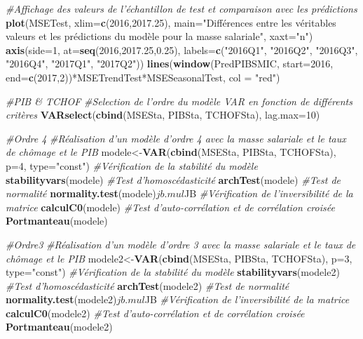 \documentclass[11pt,]{article}
\newenvironment{Shaded}{\begin{snugshade}}{\end{snugshade}}
\newcommand{\KeywordTok}[1]{\textcolor[rgb]{0.13,0.29,0.53}{\textbf{{#1}}}}
\newcommand{\DataTypeTok}[1]{\textcolor[rgb]{0.13,0.29,0.53}{{#1}}}
\newcommand{\DecValTok}[1]{\textcolor[rgb]{0.00,0.00,0.81}{{#1}}}
\newcommand{\FloatTok}[1]{\textcolor[rgb]{0.00,0.00,0.81}{{#1}}}
\newcommand{\StringTok}[1]{\textcolor[rgb]{0.31,0.60,0.02}{{#1}}}
\newcommand{\CommentTok}[1]{\textcolor[rgb]{0.56,0.35,0.01}{\textit{{#1}}}}
\newcommand{\NormalTok}[1]{{#1}}
\begin{document}
\begin{Shaded}
\begin{Highlighting}[]
\CommentTok{#Affichage des valeurs de l'échantillon de test et comparaison avec les prédictions}
\KeywordTok{plot}\NormalTok{(MSETest, }\DataTypeTok{xlim=}\KeywordTok{c}\NormalTok{(}\DecValTok{2016}\NormalTok{,}\FloatTok{2017.25}\NormalTok{), }\DataTypeTok{main=}\StringTok{"Différences entre les véritables}
\StringTok{     valeurs et les prédictions du modèle pour la masse salariale"}\NormalTok{, }\DataTypeTok{xaxt=}\StringTok{"n"}\NormalTok{)}
\KeywordTok{axis}\NormalTok{(}\DataTypeTok{side=}\DecValTok{1}\NormalTok{, }\DataTypeTok{at=}\KeywordTok{seq}\NormalTok{(}\DecValTok{2016}\NormalTok{,}\FloatTok{2017.25}\NormalTok{,}\FloatTok{0.25}\NormalTok{), }\DataTypeTok{labels=}\KeywordTok{c}\NormalTok{(}\StringTok{"2016Q1"}\NormalTok{, }\StringTok{"2016Q2"}\NormalTok{, }\StringTok{"2016Q3"}\NormalTok{, }\StringTok{"2016Q4"}\NormalTok{, }\StringTok{"2017Q1"}\NormalTok{, }\StringTok{"2017Q2"}\NormalTok{))}
\KeywordTok{lines}\NormalTok{(}\KeywordTok{window}\NormalTok{(PredPIBSMIC, }\DataTypeTok{start=}\DecValTok{2016}\NormalTok{, }\DataTypeTok{end=}\KeywordTok{c}\NormalTok{(}\DecValTok{2017}\NormalTok{,}\DecValTok{2}\NormalTok{))*MSETrendTest*MSESeasonalTest, }\DataTypeTok{col =} \StringTok{"red"}\NormalTok{)}

\CommentTok{#PIB & TCHOF}
\CommentTok{#Selection de l'ordre du modèle VAR en fonction de différents critères}
\KeywordTok{VARselect}\NormalTok{(}\KeywordTok{cbind}\NormalTok{(MSESta, PIBSta, TCHOFSta), }\DataTypeTok{lag.max=}\DecValTok{10}\NormalTok{)}

\CommentTok{#Ordre 4}
\CommentTok{#Réalisation d'un modèle d'ordre 4 avec la masse salariale et le taux de chômage et le PIB}
\NormalTok{modele<-}\KeywordTok{VAR}\NormalTok{(}\KeywordTok{cbind}\NormalTok{(MSESta, PIBSta, TCHOFSta), }\DataTypeTok{p=}\DecValTok{4}\NormalTok{, }\DataTypeTok{type=}\StringTok{"const"}\NormalTok{)}
\CommentTok{#Vérification de la stabilité du modèle}
\KeywordTok{stabilityvars}\NormalTok{(modele)}
\CommentTok{#Test d'homoscédasticité}
\KeywordTok{archTest}\NormalTok{(modele)}
\CommentTok{#Test de normalité}
\KeywordTok{normality.test}\NormalTok{(modele)$jb.mul$JB}
\CommentTok{#Vérification de l'inversibilité de la matrice}
\KeywordTok{calculC0}\NormalTok{(modele)}
\CommentTok{#Test d'auto-corrélation et de corrélation croisée}
\KeywordTok{Portmanteau}\NormalTok{(modele)}

\CommentTok{#Ordre3}
\CommentTok{#Réalisation d'un modèle d'ordre 3 avec la masse salariale et le taux de chômage et le PIB}
\NormalTok{modele2<-}\KeywordTok{VAR}\NormalTok{(}\KeywordTok{cbind}\NormalTok{(MSESta, PIBSta, TCHOFSta), }\DataTypeTok{p=}\DecValTok{3}\NormalTok{, }\DataTypeTok{type=}\StringTok{"const"}\NormalTok{)}
\CommentTok{#Vérification de la stabilité du modèle}
\KeywordTok{stabilityvars}\NormalTok{(modele2)}
\CommentTok{#Test d'homoscédasticité}
\KeywordTok{archTest}\NormalTok{(modele2)}
\CommentTok{#Test de normalité}
\KeywordTok{normality.test}\NormalTok{(modele2)$jb.mul$JB}
\CommentTok{#Vérification de l'inversibilité de la matrice}
\KeywordTok{calculC0}\NormalTok{(modele2)}
\CommentTok{#Test d'auto-corrélation et de corrélation croisée}
\KeywordTok{Portmanteau}\NormalTok{(modele2)}


\end{Highlighting}
\end{Shaded}
\end{document}
